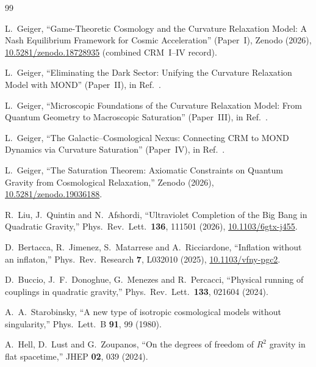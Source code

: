 \documentclass[aps,prd,twocolumn,superscriptaddress,nofootinbib]{revtex4-2}
\begin{document}
\begin{thebibliography}{99}

L.~Geiger,
``Game-Theoretic Cosmology and the Curvature Relaxation Model: A Nash Equilibrium Framework for Cosmic Acceleration'' (Paper~I),
Zenodo (2026), \href{https://doi.org/10.5281/zenodo.18728935}{10.5281/zenodo.18728935} (combined CRM~I--IV record).

L.~Geiger,
``Eliminating the Dark Sector: Unifying the Curvature Relaxation Model with MOND'' (Paper~II),
in Ref.~\cite{Geiger2026}.

L.~Geiger,
``Microscopic Foundations of the Curvature Relaxation Model: From Quantum Geometry to Macroscopic Saturation'' (Paper~III),
in Ref.~\cite{Geiger2026}.

L.~Geiger,
``The Galactic--Cosmological Nexus: Connecting CRM to MOND Dynamics via Curvature Saturation'' (Paper~IV),
in Ref.~\cite{Geiger2026}.

L.~Geiger,
``The Saturation Theorem: Axiomatic Constraints on Quantum Gravity from Cosmological Relaxation,''
Zenodo (2026), \href{https://doi.org/10.5281/zenodo.19036188}{10.5281/zenodo.19036188}.

R.~Liu, J.~Quintin and N.~Afshordi,
``Ultraviolet Completion of the Big Bang in Quadratic Gravity,''
Phys.\ Rev.\ Lett.\ \textbf{136}, 111501 (2026),
\href{https://doi.org/10.1103/6gtx-j455}{10.1103/6gtx-j455}.

D.~Bertacca, R.~Jimenez, S.~Matarrese and A.~Ricciardone,
``Inflation without an inflaton,''
Phys.\ Rev.\ Research \textbf{7}, L032010 (2025),
\href{https://doi.org/10.1103/vfny-pgc2}{10.1103/vfny-pgc2}.

D.~Buccio, J.~F.~Donoghue, G.~Menezes and R.~Percacci,
``Physical running of couplings in quadratic gravity,''
Phys.\ Rev.\ Lett.\ \textbf{133}, 021604 (2024).

A.~A.~Starobinsky,
``A new type of isotropic cosmological models without singularity,''
Phys.\ Lett.\ B \textbf{91}, 99 (1980).

A.~Hell, D.~Lust and G.~Zoupanos,
``On the degrees of freedom of $R^2$ gravity in flat spacetime,''
JHEP \textbf{02}, 039 (2024).


\end{thebibliography}
\end{document}
